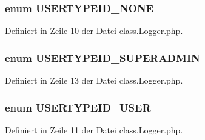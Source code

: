 \subsubsection{\setlength{\rightskip}{0pt plus 5cm}enum {\bf USERTYPEID\_\-NONE}}\label{class_8Logger_8php_a8840e348fe4a986d494b9ae74e3c764}




Definiert in Zeile 10 der Datei class.Logger.php.
\subsubsection{\setlength{\rightskip}{0pt plus 5cm}enum {\bf USERTYPEID\_\-SUPERADMIN}}\label{class_8Logger_8php_e6667279ef090ed366333f135e773496}




Definiert in Zeile 13 der Datei class.Logger.php.
\subsubsection{\setlength{\rightskip}{0pt plus 5cm}enum {\bf USERTYPEID\_\-USER}}\label{class_8Logger_8php_16d9584428f304eeb1feea27966041bf}




Definiert in Zeile 11 der Datei class.Logger.php.